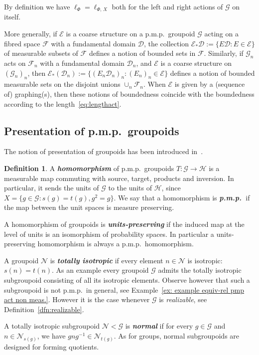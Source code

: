 \documentclass[10pt]{amsart}
\theoremstyle{definition}
\newtheorem{defi}[cdrthm]{Definition}
\newcommand{\defin}[1]{\textbf{\emph{#1}}}
\newcommand{\coarse}{\mathcal{E}}
\newcommand{\cn}{\mathcal{N}}
\newcommand{\ch}{\mathcal{H}}
\newcommand{\cg}{\mathcal{G}}
\newcommand{\cf}{\mathcal{F}}
\newcommand{\cd}{\mathcal{D}}
\newcommand{\pmp}{p.m.p.\ }
\begin{document}
By definition we have $\ell_\Phi=\ell_{\Phi,\,X}$ both for the left and right actions of $\cg$ on itself.

More generally, if $\coarse$ is a coarse structure on a \pmp groupoid $\cg$ acting on a fibred space $\cf$ with a fundamental domain $\cd$, the collection $\coarse_* \cd := \{ E \cd: E \in \coarse\}$ of measurable subsets of $\cf$ defines a notion of bounded sets in $\cf$. Similarly, if $\cg_n$ acts on $\cf_n$ with a fundamental domain $\cd_n$, and $\coarse$ is a coarse structure on $(\cg_n)_n$, then $\coarse_* (\cd_n) := \{ (E_n \cd_n)_n: (E_n)_n \in \coarse\}$ defines a notion of bounded measurable sets on the disjoint unions $\cup_n \cf_n$. When $\coarse$ is given by a (sequence of) graphing(s), then these notions of boundedness coincide with the boundedness according to the length~\eqref{eq:lengthact}.


\subsection{Presentation of \pmp groupoids}\label{subsect: presentation of groupoids}

The notion of presentation of groupoids has been introduced in~\cite{Alv08}.

\begin{defi}\label{def:groupoid_homomorphism}
A \defin{homomorphism} of \pmp groupoids $T:\cg\rightarrow \ch$ is a measurable map commuting with source, target, products and inversion. In particular, it sends the units of $\cg$ to the units of $\ch$, since $X=\{g\in \cg: s(g) = t(g),g^2=g\}$. We say that a homomorphism is
\defin{\pmp}if the map between the unit spaces is measure preserving.

A homomorphism of groupoids is \defin{units-preserving} if the induced map at the level of units is an isomorphism of probability spaces. In particular a units-preserving homomorphism is always a \pmp homomorphism.
\end{defi}

A groupoid $\cn$ is \defin{totally isotropic} if every element $n\in \cn$ is isotropic: $s(n)=t(n)$. As an example every groupoid $\cg$ admits the totally isotropic subgroupoid consisting of all its isotropic elements. Observe however that such a subgroupoid is not \pmp in general, see Example~\ref{ex: example equiv-rel pmp act non meas.}. However it is the case whenever $\cg$ is \emph{realizable}, see Definition~\ref{dfn:realizable}.

A totally isotropic subgroupoid $\cn<\cg$ is
\defin{normal} if for every $g\in \cg$ and $n\in \cn_{s(g)}$, we have $g n g^{-1}\in \cn_{t(g)}$. As for groups, normal subgroupoids are designed for forming quotients.
\end{document}
